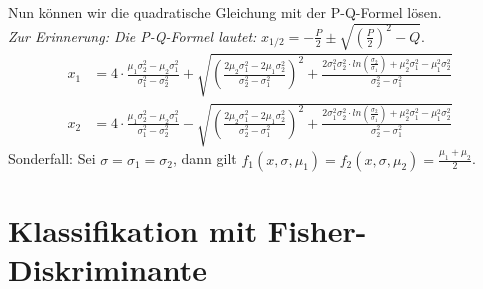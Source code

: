 \documentclass[12pt]{article}
\begin{document}
Nun k\"onnen wir die quadratische Gleichung mit der P-Q-Formel l\"osen.\\
\textit{Zur Erinnerung: Die P-Q-Formel lautet:} $x_{1/2} = -\frac{P}{2} \pm \sqrt{\left(\frac{P}{2}\right)^2 - Q}$.
\begin{align*}
x_1 &= 4 \cdot \frac{\mu_1\sigma_2^2 - \mu_2\sigma_1^2}{\sigma_1^2-\sigma_2^2} + \sqrt{\left( \frac{2\mu_2\sigma_1^2 - 2\mu_1\sigma_2^2}{\sigma_2^2-\sigma_1^2} \right)^2 + \frac{2 \sigma_1^2 \sigma_2^2 \cdot ln \left(\frac{\sigma_2}{\sigma_1}\right) + \mu_2^2\sigma_1^2 - \mu_1^2\sigma_2^2}{\sigma_2^2-\sigma_1^2}}\\
x_2 &= 4 \cdot \frac{\mu_1\sigma_2^2 - \mu_2\sigma_1^2}{\sigma_1^2-\sigma_2^2} - \sqrt{\left( \frac{2\mu_2\sigma_1^2 - 2\mu_1\sigma_2^2}{\sigma_2^2-\sigma_1^2} \right)^2 + \frac{2 \sigma_1^2 \sigma_2^2 \cdot ln \left(\frac{\sigma_2}{\sigma_1}\right) + \mu_2^2\sigma_1^2 - \mu_1^2\sigma_2^2}{\sigma_2^2-\sigma_1^2}}
\end{align*}
Sonderfall: Sei $\sigma = \sigma_1 = \sigma_2$, dann gilt $f_1(x,\sigma,\mu_1) = f_2(x,\sigma,\mu_2) = \frac{\mu_1+\mu_2}{2}$.
\newpage

\section{Klassifikation mit Fisher-Diskriminante}
\end{document}
